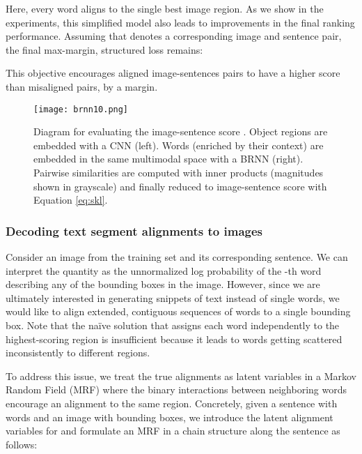 \documentclass[10pt,twocolumn,letterpaper]{article}
\begin{document}
\vspace{-0.15in}

\vspace{-0.15in}

Here, every word  aligns to the single best image region. As we show in the experiments, this simplified model also leads to improvements in the final ranking performance. Assuming that  denotes a corresponding image and sentence pair, the final max-margin, structured loss remains:

\vspace{-0.15in}

\vspace{-0.15in}

This objective encourages aligned image-sentences pairs to have a higher score than misaligned pairs, by a margin.

\begin{figure}
\centering
\texttt{[image: brnn10.png]}
\caption{Diagram for evaluating the image-sentence score . Object regions are embedded with a CNN (left). Words (enriched by their context) are embedded in the same multimodal space with a BRNN (right). Pairwise similarities are computed with inner products (magnitudes shown in grayscale) and finally reduced to image-sentence score with Equation \ref{eq:skl}.}
\label{fig:brnn}
\vspace{-0.1in}
\end{figure}

\vspace{-0.1in}
\subsubsection{Decoding text segment alignments to images}
\label{sec:mrf}
\vspace{-0.1in}

Consider an image from the training set and its corresponding sentence. We can interpret the quantity  as the unnormalized log probability of the -th word describing any of the bounding boxes in the image. However, since we are ultimately interested in generating snippets of text instead of single words, we would like to align extended, contiguous sequences of words to a single bounding box. Note that the na\"{i}ve solution that assigns each word independently to the highest-scoring region is insufficient because it leads to words getting scattered inconsistently to different regions.

To address this issue, we treat the true alignments as latent variables in a Markov Random Field (MRF) where the binary interactions between neighboring words encourage an alignment to the same region. Concretely, given a sentence with  words and an image with  bounding boxes, we introduce the latent alignment variables  for  and formulate an MRF in a chain structure along the sentence as follows:
\end{document}
